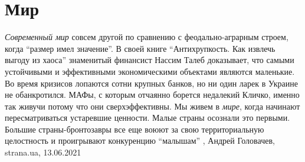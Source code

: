  
 
 
 
 
\chapter{Мир}

\emph{Современный мир} совсем другой по сравнению с феодально-аграрным строем, когда
\enquote{размер имел значение}. В своей книге \enquote{Антихрупкость. Как
извлечь выгоду из хаоса} знаменитый финансист Нассим Талеб доказывает, что
самыми устойчивыми и эффективными экономическими объектами являются маленькие.
Во время кризисов лопаются сотни крупных банков, но ни один ларек в Украине не
обанкротился.  МАФы, с которым отчаянно борется недалекий Кличко, именно так
живучи потому что они сверхэффективны.  Мы живем в \emph{мире}, когда начинают
пересматриваться устаревшие ценности. Малые страны осознали это первыми.
Большие страны-бронтозавры все еще воюют за свою территориальную целостность и
проигрывают конкуренцию \enquote{малышам}
, 
Андрей Головачев, strana.ua, 13.06.2021

